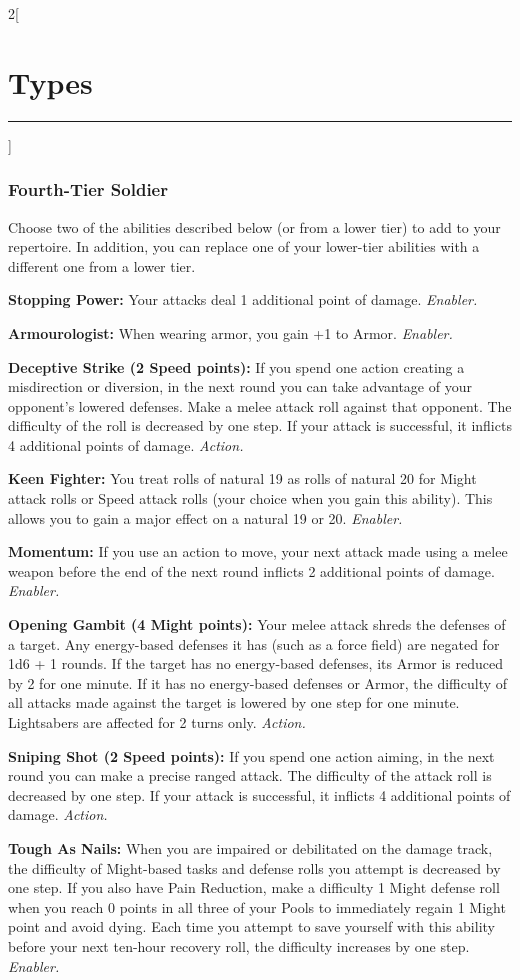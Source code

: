 \documentclass[a4paper,10pt,final]{book}
\newcommand{\HRule}{\rule{\linewidth}{0.5mm}} %
\newcommand{\newSection}[1]{\section*{#1} \addcontentsline{toc}{section}{#1} \label{sec:#1} \HRule}
\newcommand{\itemAbility}[2]{\textcolor{25gray}{\textbullet\textbf{ #1:}} {#2}\par}
\newcommand{\enabler}{\textit{ Enabler.}}
\newcommand{\action}{\textit{ Action.}}
\newenvironment{docsection}[1]
{
  \begin{multicols*}{2}[\newSection{#1}]
}
{
  \end{multicols*}
  \newpage
}
\begin{document}
\begin{docsection}{Types}
\subsubsection*{Fourth-Tier Soldier}
\label{subsub:soldierFourthTier}

Choose two of the abilities described below (or from a lower tier) to add to your repertoire. In addition, you can replace one of your lower-tier abilities with a different one from a lower tier.

\itemAbility{Stopping Power}{Your attacks deal 1 additional point of damage.\enabler}

\itemAbility{Armourologist}{When wearing armor, you gain +1 to Armor.\enabler}

\itemAbility{Deceptive Strike (2 Speed points)}{If you spend one action creating a misdirection or diversion, in the next round you can take advantage of your opponent’s lowered defenses. Make a melee attack roll against that opponent. The difficulty of the roll is decreased by one step. If your attack is successful, it inflicts 4 additional points of damage.\action}

\itemAbility{Keen Fighter}{You treat rolls of natural 19 as rolls of natural 20 for Might attack rolls or Speed attack rolls (your choice when you gain this ability). This allows you to gain a major effect on a natural 19 or 20.\enabler}

\itemAbility{Momentum}{If you use an action to move, your next attack made using a melee weapon before the end of the next round inflicts 2 additional points of damage.\enabler}

\itemAbility{Opening Gambit (4 Might points)}{Your melee attack shreds the defenses of a target. Any energy-based defenses it has (such as a force field) are negated for 1d6 + 1 rounds. If the target has no energy-based defenses, its Armor is reduced by 2 for one minute. If it has no energy-based defenses or Armor, the difficulty of all attacks made against the target is lowered by one step for one minute. Lightsabers are affected for 2 turns only.\action}

\itemAbility{Sniping Shot (2 Speed points)}{If you spend one action aiming, in the next round you can make a precise ranged attack. The difficulty of the attack roll is decreased by one step. If your attack is successful, it inflicts 4 additional points of damage.\action}

\itemAbility{Tough As Nails}{When you are impaired or debilitated on the damage track, the difficulty of Might-based tasks and defense rolls you attempt is decreased by one step. If you also have Pain Reduction, make a difficulty 1 Might defense roll when you reach 0 points in all three of your Pools to immediately regain 1 Might point and avoid dying. Each time you attempt to save yourself with this ability before your next ten-hour recovery roll, the difficulty increases by one step.\enabler}


\end{docsection}
\end{document}
